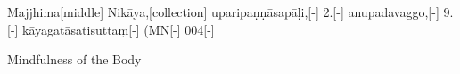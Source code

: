 
\begin{samepage}
\begingl[glneveryline={\PaliGlossA,\PaliGlossB}]
Majjhima[middle] Nikāya,[collection] uparipaṇṇāsapāḷi,[-] 2.[-] anupadavaggo,[-] 9.[-] kāyagatāsatisuttaṃ[-] (MN[-] 004[-]
\endgl
\nopagebreak
\linespread{0.5}
\begin{spacin}{0.2}
{\PaliGlossFT Mindfulness of the Body}
\end{spacin}
\vskip 12pt
\end{samepage}

